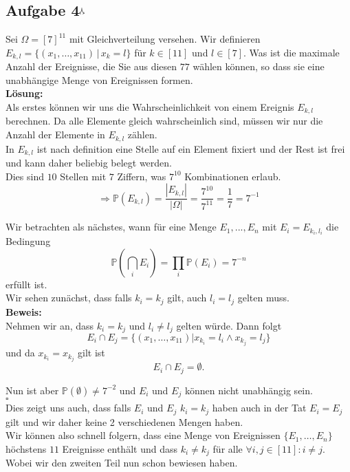 \documentclass[11pt,a4paper,ngerman]{article}
\newcommand{\Prob}{\mathbb{P}}
\newcommand{\maxw}{$^\curlywedgedownarrow$}
\begin{document}
\subsection*{Aufgabe 4\maxw}

Sei $\Omega = [7]^{11}$ mit Gleichverteilung versehen. Wir definieren $E_{k,l} = \{(x_1, \ldots , x_11) \, | \, x_k = l \}$ für $k \in [11]$ und $l \in [7]$.
Was ist die maximale Anzahl der Ereignisse, die Sie aus diesen $77$ wählen können, so dass sie eine unabhängige Menge von Ereignissen formen.\\

\textbf{Lösung:}\\

Als erstes können wir uns die Wahrscheinlichkeit von einem Ereignis $E_{k,l}$ berechnen. Da alle Elemente gleich wahrscheinlich sind,
müssen wir nur die Anzahl der Elemente in $E_{k,l}$ zählen.\\
In $E_{k,l}$ ist nach definition eine Stelle auf ein Element fixiert und der  Rest ist frei und kann daher beliebig belegt werden.\\
Dies sind $10$ Stellen mit $7$ Ziffern, was $7^{10}$ Kombinationen erlaub.
\[
    \Rightarrow \Prob (E_{k,l}) = \frac{|E_{k,l}|}{|\Omega|} = \frac{7^{10}}{7^{11}} = \frac{1}{7} = 7^{-1}
\]

Wir betrachten als nächstes, wann für eine Menge $E_1, ..., E_n$ mit $E_i = E_{k_i, l_i}$ die Bedingung
\[
    \Prob( \bigcap_i E_i) = \prod_i \Prob (E_i) = 7^{-n}
\]
erfüllt ist.\\

Wir sehen zunächst, dass falls $k_i = k_j$ gilt, auch $l_i = l_j$ gelten muss.\\
\textbf{Beweis:}\\
    Nehmen wir an, dass $k_i = k_j$ und $l_i \not= l_j$ gelten würde.
    Dann folgt
    \[
        E_i \cap E_j = \{(x_1, \ldots, x_{11}) | x_{k_i} = l_i \land x_{k_j} = l_j\}
    \]
    und da $x_{k_i} = x_{k_j}$ gilt ist
    \[
        E_i \cap E_j = \emptyset.
    \]

    Nun ist aber $\Prob (\emptyset) \not= 7^{-2}$ und $E_i$ und $E_j$ können nicht unabhängig sein.\\
\mbox{}\hfill$\square$\\

Dies zeigt uns auch, dass falls $E_i$ und $E_j$ $k_i = k_j$ haben auch in der Tat $E_i = E_j$ gilt und wir daher keine 2 verschiedenen Mengen haben.\\

Wir können also schnell folgern, dass eine Menge von Ereignissen $\{E_1, \ldots, E_n\}$ höchstens $11$ Ereignisse enthält und dass $k_i \not= k_j$
für alle $\forall i,j \in [11] : i \not= j$. Wobei wir den zweiten Teil nun schon bewiesen haben.\\
\end{document}
